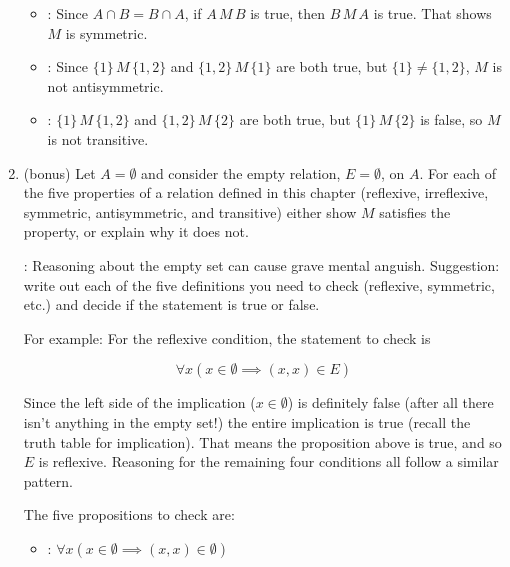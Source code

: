 \documentclass[11pt]{amsart}
\begin{document}
\begin{enumerate}
{\begin{itemize}
\item{}: Since $A\cap B = B \cap A$, if $A\,M\,B$ is true, then $B\,M\,A$ is true. That shows $M$ is 
symmetric.\\[3pt]

\item{}: Since $\{1\}\,M\,\{1,2\}$ and  $\{1, 2\}\,M\,\{1\}$ are both true, but 
 $\{1\} \not= \{1,2\}$, $M$ is not antisymmetric.\\[3pt]

\item{}: $\{1\}\,M\,\{1,2\}$ and $\{1,2\}\,M\,\{2\}$ are both true, but $\{1\}\,M\,\{2\}$
is false, 
so $M$ is not transitive.\\[5pt]

\end{itemize}
}

\vfill\break

\item (bonus)  Let $A=\emptyset$ and consider the empty relation, $E=\emptyset$,  on $A$. 
For each of the five properties of a 
relation defined in this chapter (reflexive, irreflexive, symmetric, antisymmetric, and transitive) 
either show $M$ satisfies the property, or explain why it does not.

: Reasoning about the empty set can cause grave mental anguish. Suggestion: write out each of the
five definitions you need to check (reflexive, symmetric, etc.) and decide if the statement is true or false.

For example: For the reflexive condition, the statement to check is

\[
\forall x ( x\in \emptyset \implies (x,x)\in E)
\]

Since the left side of the implication ($x\in \emptyset$) is definitely false (after all there isn't anything in the empty set!)
the entire implication is true (recall the truth table for implication). That means the proposition above is true, and so $E$ is reflexive. Reasoning for the remaining four conditions all follow a similar pattern.\\[5pt]

{\color{blue}
The five propositions to check are:

\begin{itemize}

\item {}: $\forall x ( x\in \emptyset \implies (x,x)\in \emptyset)$\\[3pt]


\end{itemize}}
\end{enumerate}
\end{document}
